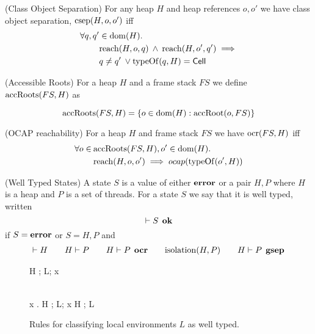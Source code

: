 \begin{definition}{(Class Object Separation)}
  For any heap $H$ and heap references $o, o'$ we have class object separation,
  $\mbox{$\mathrm{csep}$}{(H, o, o')}$ iff
  \begin{align}
    \label{eq:csep_def}
    \forall q, q' &\in \mbox{$\mathrm{dom}$}{(H)}. \notag\\
    & \mbox{$\mathrm{reach}$}{(H, o, q)} \: \land \: \mbox{$\mathrm{reach}$}{(H, o', q')} \implies \notag\\ 
    &q \neq q' \: \lor \mbox{$\mathrm{typeOf}$}{(q, H)} = \mbox{$\mathsf{Cell}$}
  \end{align}
\end{definition}

\begin{definition}{(Accessible Roots)}
  For a heap $H$ and a frame stack $FS$ we define $\mbox{$\mathrm{accRoots}$}{(FS, H)}$ as

  \begin{equation}
    \mbox{$\mathrm{accRoots}$}{(FS, H)} = \left\{ o \in \mbox{$\mathrm{dom}$}{(H)}: \mbox{$\mathrm{accRoot}$}{(o, FS)} \right\}
  \end{equation}
\end{definition}

\begin{definition}{(OCAP reachability)}
  For a heap $H$ and frame stack $FS$ we have $\mbox{$\mathrm{ocr}$}{(FS,H)}$ iff
  \begin{align}
    \label{eq:ocr_def}
    \forall o \in \: &\mbox{$\mathrm{accRoots}$}(FS,H), o' \in \mbox{$\mathrm{dom}$}(H). \notag\\
    &\mbox{$\mathrm{reach}$}{(H, o, o')} \implies \mbox{$ocap$}{(\mbox{$\mathrm{typeOf}$}{(o', H)})}
  \end{align}
\end{definition}

\begin{definition}{(Well Typed States)}
  A state $S$ is a value of either $\mbox{{\bf error}}$ or a pair $H, P$ where $H$ is a heap
  and $P$ is a set of threads. For a state $S$ we say that it is well typed,
  written
  \begin{equation}
    \vdash S \:\: \mbox{\bf ok}
  \end{equation}
  if $S = \mbox{{\bf error}}$ or $S = H, P$ and
  \begin{align}
    \vdash H \quad\quad H \vdash P \quad\quad H \vdash P \:\: \mbox{\bf ocr} \quad\quad \mbox{$\mathrm{isolation}$}{(H, P)}
    \quad\quad H \vdash P \:\: \mbox{\bf gsep}
  \end{align}
  
\end{definition}

\begin{figure}
  {}
  { H \vdash \Gamma; L; x }

  \RuleSpace{}

  {\dom{(\Gamma)} \subseteq {} \\
    \forall x \in \dom{(\Gamma)}. \: H \vdash \Gamma; L; x 
  }
  { H \vdash \Gamma; L }

  \caption{Rules for classifying local environments $L$ as well typed.}
  \label{fig:local_typing}
\end{figure}

